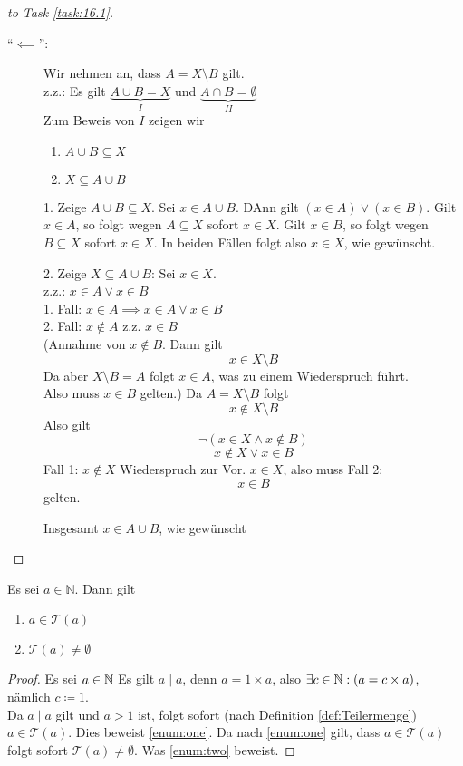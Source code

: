 \documentclass{myclass}
\begin{document}
\begin{proof}[to Task \ref{task:16.1}]
\begin{description}
		\item[``$ \impliedby $'':]
			Wir nehmen an, dass $ A = X \setminus B $ gilt.\\
			z.z.: Es gilt $ \underbrace{ A \cup B = X }_{ I } $ und $ \underbrace{ A \cap B = \emptyset }_{ II } $\\
			Zum Beweis von $ I $ zeigen wir
			\begin{enumerate}
				\item \label{enum:ACupBSubseteqX} $ A \cup B \subseteq X $
				\item \label{enum:XSubseteqACupB} $ X \subseteq A \cup B $
			\end{enumerate}
			1. Zeige $ A \cup B \subseteq X $. Sei $ x \in A \cup B $. DAnn gilt $ ( x \in A ) \vee ( x \in B ) $. Gilt $ x \in A $, so folgt wegen $ A \subseteq X $ sofort $ x \in X $. Gilt $ x \in B $, so folgt wegen $ B \subseteq X $ sofort $ x \in X $. In beiden Fällen folgt also $ x \in X $, wie gewünscht.\par
			2. Zeige $ X \subseteq A \cup B $: Sei $ x \in X $.\\
			z.z.: $ x \in A \vee x \in B $\\
			1. Fall: $ x \in A \implies x \in A \vee x \in B $\\
			2. Fall: $ x \notin A $ z.z. $ x \in B $\\
			(Annahme von $ x \notin B $. Dann gilt
			\[ x \in X \setminus B \]
			Da aber $ X \setminus B = A $ folgt $ x \in A $, was zu einem Wiederspruch führt.\\
			Also muss $x  \in B $ gelten.)
			Da $ A = X \setminus B $ folgt
			\[ x \notin X \setminus B \]
			Also gilt
			\[ \neg ( x \in X \wedge x \notin B ) \]
			\[ x \notin X \vee x \in B \]
			Fall 1: $ x \notin X $ Wiederspruch zur Vor. $ x \in X $, also muss
			Fall 2: 
			\[x \in B \]
			gelten.\par
			Insgesamt $ x \in A \cup B $, wie gewünscht
	\end{description}
\end{proof}

\begin{lemma}
	Es sei $ a \in \mathbb{N} $. Dann gilt
	\begin{enumerate}[label=(\roman*)]
		\item $ a \in \mathcal{T}(a) $ \label{enum:one}
		\item $ \mathcal{T}(a) \neq \emptyset $ \label{enum:two}
	\end{enumerate}
	\begin{proof}
		Es sei $ a \in \mathbb{N} $ Es gilt $ a \mid a $, denn $ a = 1 \times a $, also $ \exists c \in \mathbb{N} : (a = c \times a ) $, nämlich $ c \coloneqq 1 $.\\
		Da $ a \mid a $ gilt und $ a > 1 $ ist, folgt sofort (nach Definition \ref{def:Teilermenge}) $ a \in \mathcal{T}(a) $. Dies beweist \ref{enum:one}.
		Da nach \ref{enum:one} gilt, dass $ a \in \mathcal{T}(a) $ folgt sofort $ \mathcal{T}(a) \neq \emptyset $. Was \ref{enum:two} beweist.
	\end{proof}
\end{lemma}
\end{document}
